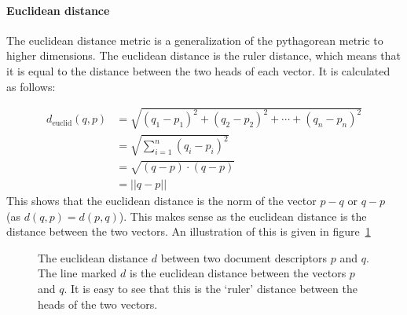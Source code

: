 \paragraph{Euclidean distance}
The euclidean distance metric is a generalization of the pythagorean metric to
higher dimensions. The euclidean distance is the ruler distance, which means that
it is equal to the distance between the two heads of each vector. It is calculated
as follows:

\begin{align*}
  d_{\text{euclid}}(q,p) &= \sqrt{(q_1 - p_1)^2 + (q_2 - p_2)^2 + \cdots + (q_n - p_n)^2}  \\
                         &= \sqrt{\sum_{i=1}^n (q_i - p_i)^2} \\
                         &= \sqrt {(q-p) \cdot (q-p)} \\
                         &= || q - p ||
\end{align*}
This shows that the euclidean distance is the norm of the vector $p-q$ or 
$q-p$ (as $d(q,p) = d(p,q)$). This makes sense as the euclidean distance
is the distance between the two vectors. An illustration of this is given in
figure~\ref{fig:euclid}

\begin{figure}[h!]
 \center

 \caption{The euclidean distance $d$ between two document descriptors $p$ and $q$. The line marked $d$ is the euclidean distance between the vectors $p$ and $q$. It is easy to see that this is the `ruler' distance between the heads of the two vectors.}
 \label{fig:euclid}
\end{figure}

